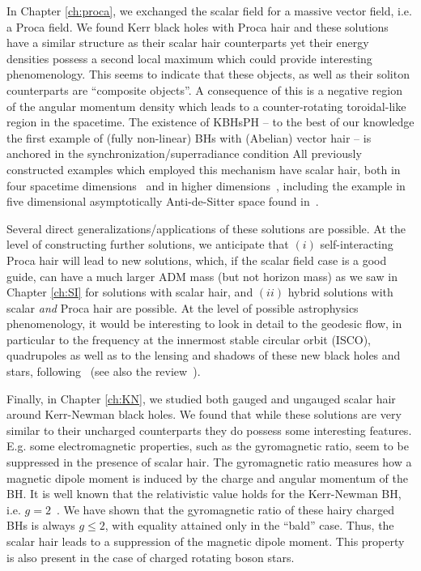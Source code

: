 In Chapter \ref{ch:proca}, we exchanged the scalar field for a massive vector field, i.e. a Proca field.
We found Kerr black holes with Proca hair and these solutions have a similar structure as their scalar hair counterparts yet their energy densities possess a second local maximum which could provide interesting phenomenology.
This seems to indicate that these objects, as well as their soliton counterparts are ``composite objects''.
A consequence of this is a negative region of the angular momentum density which leads to a counter-rotating toroidal-like region in the spacetime.
The existence of KBHsPH -- to the best of our knowledge the first example of (fully non-linear)   
BHs with (Abelian) vector hair -- is anchored  in the synchronization/superradiance condition
%
All previously constructed examples which employed this mechanism have scalar hair, 
both in four spacetime dimensions~\cite{Herdeiro:2014goa,Herdeiro:2015gia,Kleihaus:2015iea,Herdeiro:2015tia} and in higher dimensions~\cite{Brihaye:2014nba,Herdeiro:2015kha}, 
including the example in five dimensional asymptotically Anti-de-Sitter space found in~\cite{Dias:2011at}. 

Several direct generalizations/applications of these solutions are possible. 
At the level of constructing further 
solutions, we anticipate that 
$(i)$ self-interacting Proca hair will lead to new solutions, 
which, if the scalar field case is a good guide, can have a much larger ADM mass (but not horizon mass) as we saw in Chapter \ref{ch:SI} for solutions with scalar hair,
and
$(ii)$ hybrid solutions with scalar \emph{and} Proca hair are possible. 
At the level of possible astrophysics phenomenology, 
it would be interesting to look in detail to the geodesic flow, 
in particular to the frequency at the innermost stable circular orbit (ISCO), 
quadrupoles as well as to the lensing and shadows of these new black holes and stars,
following~\cite{Cunha:2015yba} (see also the review~\cite{Johannsen:2015mdd}). 

\bigskip

Finally, in Chapter \ref{ch:KN}, we studied both gauged and ungauged scalar hair around Kerr-Newman black holes.
We found that while these solutions are very similar to their uncharged counterparts they do possess some interesting features.
E.g. some electromagnetic properties, such as the gyromagnetic ratio, seem to be suppressed in the presence of scalar hair.
The gyromagnetic ratio measures how a magnetic dipole moment is induced by the charge and angular momentum of the BH.
It is well known that the relativistic value holds for the Kerr-Newman BH, i.e. $g=2$~\cite{Carter:1968rr}.
We have shown that the gyromagnetic ratio of these hairy charged BHs is always $g\leqslant 2$, with equality attained only in the ``bald'' case.
Thus, the scalar hair leads to a suppression of the magnetic dipole moment.
This property is also present in the case of charged rotating boson stars.

